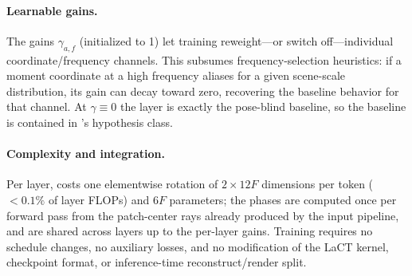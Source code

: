 \paragraph{Learnable gains.}
The gains $\gamma_{a,f}$ (initialized to 1) let training reweight---or
switch off---individual coordinate/frequency channels. This subsumes
frequency-selection heuristics: if a moment coordinate at a high frequency
aliases for a given scene-scale distribution, its gain can decay toward
zero, recovering the baseline behavior for that channel. At
$\gamma \equiv 0$ the layer is exactly the pose-blind baseline, so the
baseline is contained in \ours{}'s hypothesis class.

\paragraph{Complexity and integration.}
Per layer, \ours{} costs one elementwise rotation of $2 \times 12F$
dimensions per token ($<0.1\%$ of layer FLOPs) and $6F$ parameters; the
phases are computed once per forward pass from the patch-center rays
already produced by the input pipeline, and are shared across layers up to
the per-layer gains. Training requires no schedule changes, no auxiliary
losses, and no modification of the LaCT kernel, checkpoint format, or
inference-time reconstruct/render split.
